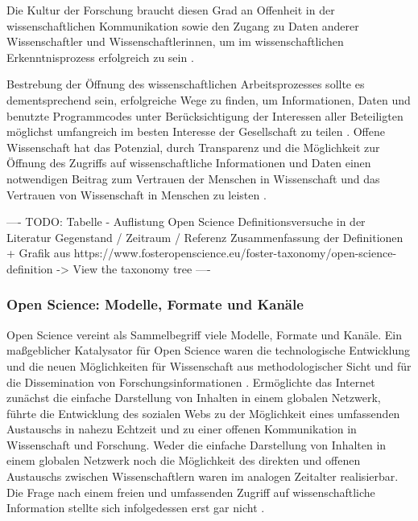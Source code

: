 Die Kultur der Forschung braucht diesen Grad an Offenheit in der wissenschaftlichen Kommunikation sowie den Zugang zu Daten anderer Wissenschaftler und Wissenschaftlerinnen, um im wissenschaftlichen Erkenntnisprozess erfolgreich zu sein \cite{Fecher_2015} \cite{Krumholz_2014} \cite{Patlak_2010}.

Bestrebung der Öffnung des wissenschaftlichen Arbeitsprozesses sollte es dementsprechend sein, erfolgreiche Wege zu finden, um Informationen, Daten und benutzte Programmcodes unter Berücksichtigung der Interessen aller Beteiligten möglichst umfangreich im besten Interesse der Gesellschaft zu teilen \cite{Naeder_2010} \cite{Ross_2013} \cite{Hey_2015}. Offene Wissenschaft hat das Potenzial, durch Transparenz und die Möglichkeit zur Öffnung des Zugriffs auf wissenschaftliche Informationen und Daten einen notwendigen Beitrag zum Vertrauen der Menschen in Wissenschaft und das Vertrauen von Wissenschaft in Menschen zu leisten \cite{Grand_2012}.

---- TODO: Tabelle - Auflistung Open Science Definitionsversuche in der Literatur Gegenstand / Zeitraum / Referenz Zusammenfassung der Definitionen + Grafik aus https://www.fosteropenscience.eu/foster-taxonomy/open-science-definition -> View the taxonomy tree ----

\subsubsection{Open Science: Modelle, Formate und Kanäle}

Open Science vereint als Sammelbegriff viele Modelle, Formate und Kanäle. Ein maßgeblicher Katalysator für Open Science waren die technologische Entwicklung und die neuen Möglichkeiten für Wissenschaft aus methodologischer Sicht und für die Dissemination von Forschungsinformationen \cite{Garcia_2010}. Ermöglichte das Internet zunächst die einfache Darstellung von Inhalten in einem globalen Netzwerk, führte die Entwicklung des sozialen Webs zu der Möglichkeit eines umfassenden Austauschs in nahezu Echtzeit und zu einer offenen Kommunikation in Wissenschaft und Forschung. Weder die einfache Darstellung von Inhalten in einem globalen Netzwerk noch die Möglichkeit des direkten und offenen Austauschs zwischen Wissenschaftlern waren im analogen Zeitalter realisierbar. Die Frage nach einem freien und umfassenden Zugriff auf wissenschaftliche Information stellte sich infolgedessen erst gar nicht \cite{Schirmbacher_2007}.

